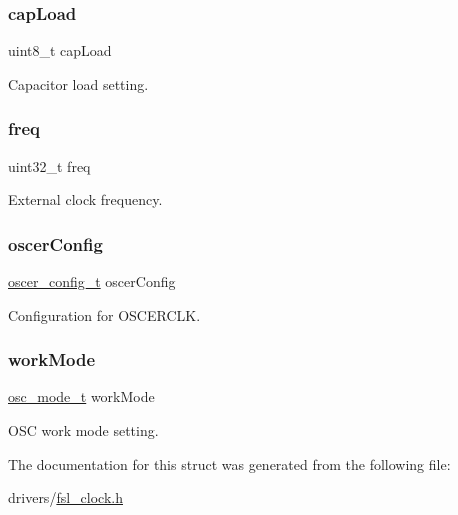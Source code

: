 \subsubsection{\texorpdfstring{capLoad}{capLoad}}
{\footnotesize\ttfamily uint8\+\_\+t cap\+Load}

Capacitor load setting. \mbox{\label{struct__osc__config_aacfad457f5366fa9265eb0a89e43f23b}} 
\subsubsection{\texorpdfstring{freq}{freq}}
{\footnotesize\ttfamily uint32\+\_\+t freq}

External clock frequency. \mbox{\label{struct__osc__config_af37407a042780c0e65e57af58393c629}} 
\subsubsection{\texorpdfstring{oscerConfig}{oscerConfig}}
{\footnotesize\ttfamily \mbox{\hyperlink{group__clock_ga3280fcfc08b1b4b0989197cc56239fb6}{oscer\+\_\+config\+\_\+t}} oscer\+Config}

Configuration for O\+S\+C\+E\+R\+C\+LK. \mbox{\label{struct__osc__config_a5ad1f7dc2a43d53bc15fc8c8d969e605}} 
\subsubsection{\texorpdfstring{workMode}{workMode}}
{\footnotesize\ttfamily \mbox{\hyperlink{group__clock_ga86e25a9d93f6b00c118c7f8eda32d67b}{osc\+\_\+mode\+\_\+t}} work\+Mode}

O\+SC work mode setting. 

The documentation for this struct was generated from the following file\+:\begin{DoxyCompactItemize}
\item 
drivers/\mbox{\hyperlink{fsl__clock_8h}{fsl\+\_\+clock.\+h}}\end{DoxyCompactItemize}
